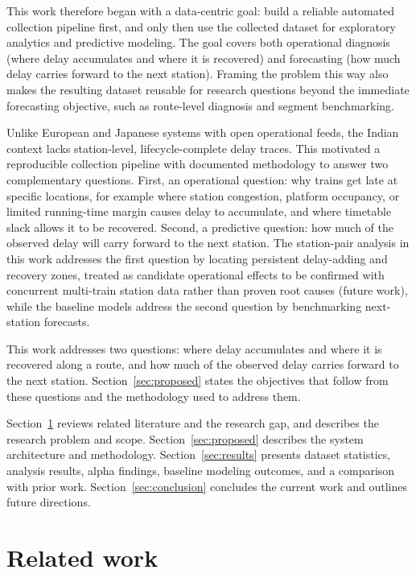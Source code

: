 \documentclass[a4paper,fleqn]{cas-dc}
\begin{document}
This work therefore began with a data-centric goal: build a reliable
automated collection pipeline first, and only then use the collected dataset
for exploratory analytics and predictive modeling. The goal covers both
operational diagnosis (where delay accumulates and where it is recovered) and
forecasting (how much delay carries forward to the next station). Framing the
problem this way also makes the resulting dataset reusable for research
questions beyond the immediate forecasting objective, such as route-level
diagnosis and segment benchmarking.

Unlike European and Japanese systems with open operational feeds, the Indian
context lacks station-level, lifecycle-complete delay traces. This motivated
a reproducible collection pipeline with documented methodology to answer two
complementary questions. First, an operational question: why trains get late
at specific locations, for example where station congestion, platform
occupancy, or limited running-time margin causes delay to accumulate, and
where timetable slack allows it to be recovered. Second, a predictive
question: how much of the observed delay will carry forward to the next
station. The station-pair analysis in this work addresses the first question
by locating persistent delay-adding and recovery zones, treated as candidate
operational effects to be confirmed with concurrent multi-train station data
rather than proven root causes (future work), while the baseline models
address the second question by benchmarking
next-station forecasts.

This work addresses two questions: where delay accumulates and where it is
recovered along a route, and how much of the observed delay carries forward to
the next station. Section~\ref{sec:proposed} states the objectives that follow
from these questions and the methodology used to address them.

Section~\ref{sec:related} reviews related literature and the research gap,
and describes the research problem and scope.
Section~\ref{sec:proposed} describes the system architecture and methodology.
Section~\ref{sec:results} presents dataset
statistics, analysis results, alpha findings, baseline modeling outcomes,
and a comparison with prior work. Section~\ref{sec:conclusion} concludes the
current work and outlines future directions.

\section{Related work}
\label{sec:related}
\end{document}
